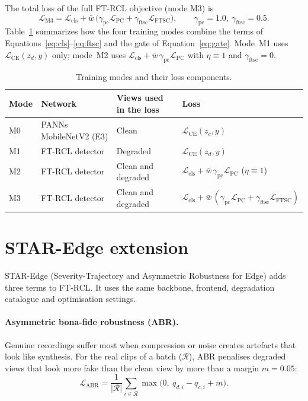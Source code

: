 The total loss of the full FT-RCL objective (mode M3) is
\begin{equation}
\mathcal{L}_{\mathrm{M3}} = \mathcal{L}_{\mathrm{cls}} + \bar{w}\,\Big(\gamma_{\mathrm{pc}}\mathcal{L}_{\mathrm{PC}} + \gamma_{\mathrm{ftsc}}\mathcal{L}_{\mathrm{FTSC}}\Big), \qquad \gamma_{\mathrm{pc}} = 1.0,\ \gamma_{\mathrm{ftsc}} = 0.5 .
\label{eq:m3}
\end{equation}
Table~\ref{tab:modes} summarizes how the four training modes combine the terms of Equations~\eqref{eq:cls}--\eqref{eq:ftsc} and the gate of Equation~\eqref{eq:gate}. Mode~M1 uses $\mathcal{L}_{\mathrm{CE}}(z_d,y)$ only; mode~M2 uses $\mathcal{L}_{\mathrm{cls}} + \bar{w}\,\gamma_{\mathrm{pc}}\mathcal{L}_{\mathrm{PC}}$ with $\eta \equiv 1$ and $\gamma_{\mathrm{ftsc}} = 0$.

\begin{table}[htbp]
\centering
\caption{Training modes and their loss components.}
\label{tab:modes}
\small
\renewcommand{\arraystretch}{1.2}
\begin{tabular}{@{}llll@{}}
\toprule
Mode & Network & Views used in the loss & Loss \\
\midrule
M0 & PANNs MobileNetV2 (E3) & Clean & $\mathcal{L}_{\mathrm{CE}}(z_c,y)$ \\
M1 & FT-RCL detector & Degraded & $\mathcal{L}_{\mathrm{CE}}(z_d,y)$ \\
M2 & FT-RCL detector & Clean and degraded & $\mathcal{L}_{\mathrm{cls}} + \bar{w}\,\gamma_{\mathrm{pc}}\mathcal{L}_{\mathrm{PC}}$ ($\eta\equiv 1$) \\
M3 & FT-RCL detector & Clean and degraded & $\mathcal{L}_{\mathrm{cls}} + \bar{w}\,(\gamma_{\mathrm{pc}}\mathcal{L}_{\mathrm{PC}} + \gamma_{\mathrm{ftsc}}\mathcal{L}_{\mathrm{FTSC}})$ \\
\bottomrule
\end{tabular}
\end{table}

\section{STAR-Edge extension}
\label{sec:star-edge-method}

STAR-Edge (Severity-Trajectory and Asymmetric Robustness for Edge) adds three terms to FT-RCL. It uses the same backbone, frontend, degradation catalogue and optimisation settings.

\paragraph{Asymmetric bona-fide robustness (ABR).} Genuine recordings suffer most when compression or noise creates artefacts that look like synthesis. For the real clips of a batch ($\mathcal{R}$), ABR penalises degraded views that look more fake than the clean view by more than a margin $m=0.05$:
\begin{equation}
\mathcal{L}_{\mathrm{ABR}} = \frac{1}{|\mathcal{R}|}\sum_{i\in\mathcal{R}} \max\big(0,\ q_{d,i}-q_{c,i}+m\big).
\label{eq:abr}
\end{equation}

